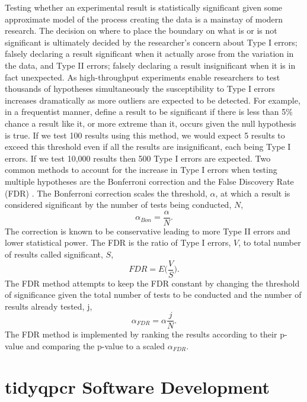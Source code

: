 \documentclass[../main.tex]{subfiles}
\begin{document}
Testing whether an experimental result is statistically significant given some approximate model of the process creating the data is a mainstay of modern research.
The decision on where to place the boundary on what is or is not significant is ultimately decided by the researcher's concern about Type I errors; falsely declaring a result significant when it actually arose from the variation in the data, and Type II errors; falsely declaring a result insignificant when it is in fact unexpected.
As high-throughput experiments enable researchers to test thousands of hypotheses simultaneously the susceptibility to Type I errors increases dramatically as more outliers are expected to be detected.
For example, in a frequentist manner, define a result to be significant if there is less than 5\% chance a result like it, or more extreme than it, occurs given the null hypothesis is true.
If we test 100 results using this method, we would expect 5 results to exceed this threshold even if all the results are insignificant, each being Type I errors.
If we test 10,000 results then 500 Type I errors are expected.
Two common methods to account for the increase in Type I errors when testing multiple hypotheses are the Bonferroni correction and the False Discovery Rate (FDR) \parencite{Bonferroni1936, Hochberg1995}.
The Bonferroni correction scales the threshold, $\alpha$, at which a result is considered significant by the number of tests being conducted, $N$,
$$\alpha_{Bon} = \frac{\alpha}{N}.$$
The correction is known to be conservative leading to more Type II errors and lower statistical power.
The FDR is the ratio of Type I errors, $V$, to total number of results called significant, $S$,
$$FDR = E\Big(\frac{V}{S}\Big).$$ 
The FDR method attempts to keep the FDR constant by changing the threshold of significance given the total number of tests to be conducted and the number of results already tested, j,
$$\alpha_{FDR} = \alpha \frac{j}{N}.$$
The FDR method is implemented by ranking the results according to their p-value and comparing the p-value to a scaled $\alpha_{FDR}$.

\section{tidyqpcr Software Development}
\end{document}
